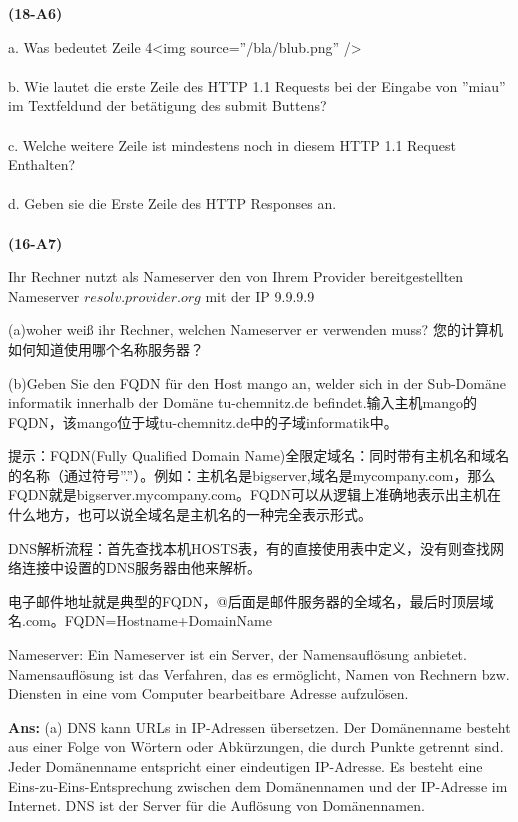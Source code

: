 \documentclass[fleqn]{article}
\begin{document}
\noindent\textbf{(18-A6)}

a. Was bedeutet Zeile 4<img source=”/bla/blub.png” />
\\
\\
\indent b. Wie lautet die erste Zeile des HTTP 1.1 Requests bei der Eingabe von ”miau” im Textfeldund der betätigung des submit Buttens?
\\
\\
\indent c. Welche weitere Zeile ist mindestens noch in diesem HTTP 1.1 Request Enthalten?
\\
\\
\indent d. Geben sie die Erste Zeile des HTTP Responses an.
\\
\\
\noindent\textbf{(16-A7)} 

Ihr Rechner nutzt als Nameserver den von Ihrem Provider bereitgestellten Nameserver $resolv.provider.org$ mit der IP 9.9.9.9

(a)woher weiß ihr Rechner, welchen Nameserver er verwenden muss? 您的计算机如何知道使用哪个名称服务器？

(b)Geben Sie den FQDN für den Host mango an, welder sich in der Sub-Domäne informatik innerhalb der Domäne tu-chemnitz.de befindet.输入主机mango的FQDN，该mango位于域tu-chemnitz.de中的子域informatik中。

提示：FQDN(Fully Qualified Domain Name)全限定域名：同时带有主机名和域名的名称（通过符号”.”）。例如：主机名是bigserver,域名是mycompany.com，那么FQDN就是bigserver.mycompany.com。FQDN可以从逻辑上准确地表示出主机在什么地方，也可以说全域名是主机名的一种完全表示形式。

DNS解析流程：首先查找本机HOSTS表，有的直接使用表中定义，没有则查找网络连接中设置的DNS服务器由他来解析。

电子邮件地址就是典型的FQDN，@后面是邮件服务器的全域名，最后时顶层域名.com。FQDN=Hostname+DomainName

Nameserver: Ein Nameserver ist ein Server, der Namensauflösung anbietet. Namensauflösung ist das Verfahren, das es ermöglicht, Namen von Rechnern bzw. Diensten in eine vom Computer bearbeitbare Adresse aufzulösen.

\textbf{Ans:} (a) DNS kann URLs in IP-Adressen übersetzen. Der Domänenname besteht aus einer Folge von Wörtern oder Abkürzungen, die durch Punkte getrennt sind. Jeder Domänenname entspricht einer eindeutigen IP-Adresse. Es besteht eine Eins-zu-Eins-Entsprechung zwischen dem Domänennamen und der IP-Adresse im Internet. DNS ist der Server für die Auflösung von Domänennamen.
\end{document}
